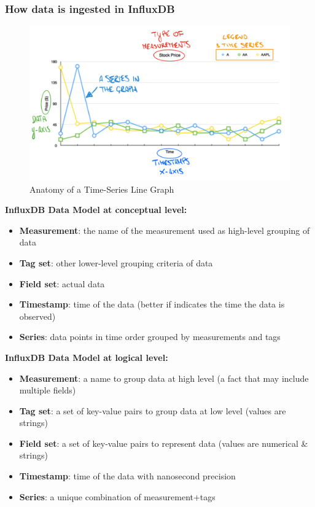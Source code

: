 \documentclass[10pt,a4paper]{article}
\begin{document}
\subsubsection{How data is ingested in InfluxDB}
   \begin{figure}[ht!]
 \hfill \includegraphics[width=350pt]{images/influxdb-line-chart}
 \hspace*{\fill}
 \caption{Anatomy of a Time-Series Line Graph}
 \end{figure} 
 \textbf{InfluxDB Data Model at conceptual level:}
 \begin{itemize}
 	\item \textbf{Measurement}: the name of the measurement used as high-level grouping of data
 	\item \textbf{Tag set}: other lower-level grouping criteria of data
 	\item \textbf{Field set}: actual data
 	\item \textbf{Timestamp}: time of the data (better if indicates the time the data is observed)
 	\item \textbf{Series}: data points in time order grouped by measurements and tags
 \end{itemize}
  \textbf{InfluxDB Data Model at logical level:}
 \begin{itemize}
 	\item \textbf{Measurement}: a name to group data at high level (a fact that may include multiple fields)
 	\item \textbf{Tag set}: a set of key-value pairs to group data at low level (values are strings)
 	\item \textbf{Field set}: a set of key-value pairs to represent data (values are numerical \& strings)
 	\item \textbf{Timestamp}: time of the data with nanosecond precision
 	\item \textbf{Series}: a unique combination of measurement+tags
 \end{itemize}
\end{document}

